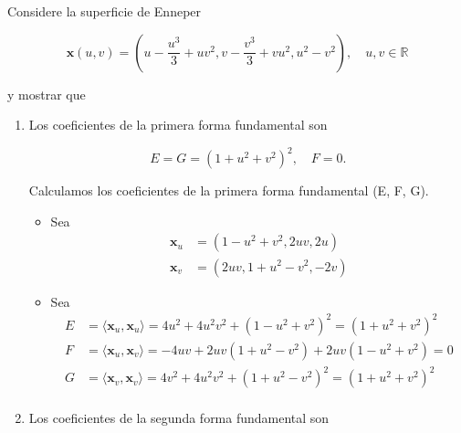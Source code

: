 \begin{problema}
    Considere la superficie de Enneper

$$
\mathbf{x}(u, v)=\left(u-\frac{u^{3}}{3}+u v^{2}, v-\frac{v^{3}}{3}+v u^{2}, u^{2}-v^{2}\right), \quad u, v \in \mathbb{R}
$$

y mostrar que
\begin{enumerate}
    \item Los coeficientes de la primera forma fundamental son

    $$
    E=G=\left(1+u^{2}+v^{2}\right)^{2}, \quad F=0 .
    $$
    
    \begin{sol}
        Calculamos los coeficientes de la primera forma fundamental (E, F, G).
        \begin{itemize}
            \item Sea  
            \begin{align*}
                \mathbf{x}_u &= \left(1-u^2+v^2,2 u v,2 u\right) \\
                \mathbf{x}_v &= \left(2 u v,1+u^2-v^2,-2 v\right)
            \end{align*}
            \item Sea
            \begin{align*}
                E &= \langle \mathbf{x}_u, \mathbf{x}_u \rangle = 4 u^2+4 u^2 v^2+(1-u^2+v^2)^2=\left(1+u^{2}+v^{2}\right)^{2}\\
                F &= \langle \mathbf{x}_u, \mathbf{x}_v \rangle = -4 u v+2 u v (1+u^2-v^2)+2 u v (1-u^2+v^2)= 0\\
                G &= \langle \mathbf{x}_v, \mathbf{x}_v \rangle = 4 v^2+4 u^2 v^2+(1+u^2-v^2)^2=\left(1+u^{2}+v^{2}\right)^{2}\\
            \end{align*}
           
            
        \end{itemize}


    \end{sol}
    \item Los coeficientes de la segunda forma fundamental son
    

\end{enumerate}
\end{problema}
